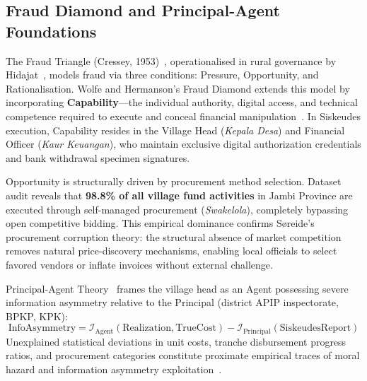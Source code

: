 \documentclass[runningheads]{llncs}
\begin{document}
\subsection{Fraud Diamond and Principal-Agent Foundations}
The Fraud Triangle (Cressey, 1953)~\cite{ref17}, operationalised in rural governance by Hidajat~\cite{ref6}, models fraud via three conditions: Pressure, Opportunity, and Rationalisation. Wolfe and Hermanson's Fraud Diamond extends this model by incorporating \textbf{Capability}---the individual authority, digital access, and technical competence required to execute and conceal financial manipulation~\cite{ref17b}. In Siskeudes execution, Capability resides in the Village Head (\textit{Kepala Desa}) and Financial Officer (\textit{Kaur Keuangan}), who maintain exclusive digital authorization credentials and bank withdrawal specimen signatures.

Opportunity is structurally driven by procurement method selection. Dataset audit reveals that \textbf{98.8\% of all village fund activities} in Jambi Province are executed through self-managed procurement (\textit{Swakelola}), completely bypassing open competitive bidding. This empirical dominance confirms S{\o}reide's~\cite{ref9} procurement corruption theory: the structural absence of market competition removes natural price-discovery mechanisms, enabling local officials to select favored vendors or inflate invoices without external challenge.

Principal-Agent Theory~\cite{ref25} frames the village head as an Agent possessing severe information asymmetry relative to the Principal (district APIP inspectorate, BPKP, KPK):
\begin{equation}
\text{InfoAsymmetry} = \mathcal{I}_{\text{Agent}}(\text{Realization}, \text{TrueCost}) - \mathcal{I}_{\text{Principal}}(\text{SiskeudesReport})
\end{equation}
Unexplained statistical deviations in unit costs, tranche disbursement progress ratios, and procurement categories constitute proximate empirical traces of moral hazard and information asymmetry exploitation~\cite{ref9,ref25}.
\end{document}
